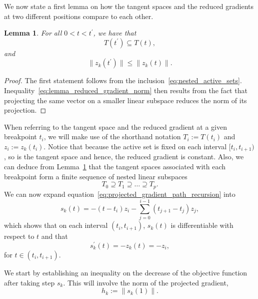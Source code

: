 \documentclass{article}
\numberwithin{equation}{section}
\theoremstyle{plain}
\newtheorem{lemma}[theorem]{Lemma}
\begin{document}
	We now state a first lemma on how the tangent spaces and the reduced gradients at two different positions compare to each other.
	\begin{lemma}\label{lemma:non_increasing_reduced_gradient_norm}
		For all $0 < t < t^\prime$, we have that 
		\begin{equation*}
			T(t^\prime) \subseteq	T(t),
		\end{equation*}
		and
		\begin{equation}\label{eq:lemma_reduced_gradient_norm}
			\|z_k(t^\prime)\| \le \|z_k(t)\|.
		\end{equation}
	\end{lemma}
	\begin{proof}
		The first statement follows from the inclusion~\eqref{eq:nested_active_sets}. Inequality~\eqref{eq:lemma_reduced_gradient_norm} then results from the fact that projecting the same vector on a smaller linear subspace reduces the norm of its projection. 
	\end{proof}
	When referring to the tangent space and the reduced gradient at a given breakpoint $t_i$, we will make use of the shorthand notation $T_i := T(t_i)$ and $z_i:=z_k(t_i)$. Notice that because the active set is fixed on each interval $[t_i,t_{i+1})$, so is the tangent space and hence, the reduced gradient is constant. Also, we can deduce from Lemma~\ref{lemma:non_increasing_reduced_gradient_norm} that the tangent spaces associated with each breakpoint form a finite sequence of nested linear subspaces
	\[T_0 \supseteq T_1 \supseteq \ldots \supseteq T_p.\]
	We can now expand equation~\eqref{eq:projected_gradient_path_recursion} into
	\begin{equation}\label{eq:projected_gradient_path_full_expr}
		s_k(t) = -(t-t_i)z_i - \sum_{j=0}^{i-1}(t_{j+1}-t_j)z_j,
	\end{equation}
	which shows that on each interval $(t_i,t_{i+1})$, $s_k(t)$ is differentiable with respect to $t$ and that
	\begin{equation}\label{eq:projected_gradient_path_derivative}
		s_k^\prime(t) = -z_k(t) = -z_i,
	\end{equation}
	for $t \in (t_i,t_{i+1})$.
	
	We start by establishing an inequality on the decrease of the objective function after taking step $s_k$. This will involve the norm of the projected gradient,
	\begin{equation}\label{eq:crit_norm_projected_grad}
		h_k := \left\|s_k(1)\right\|.
	\end{equation}
	
\end{document}
